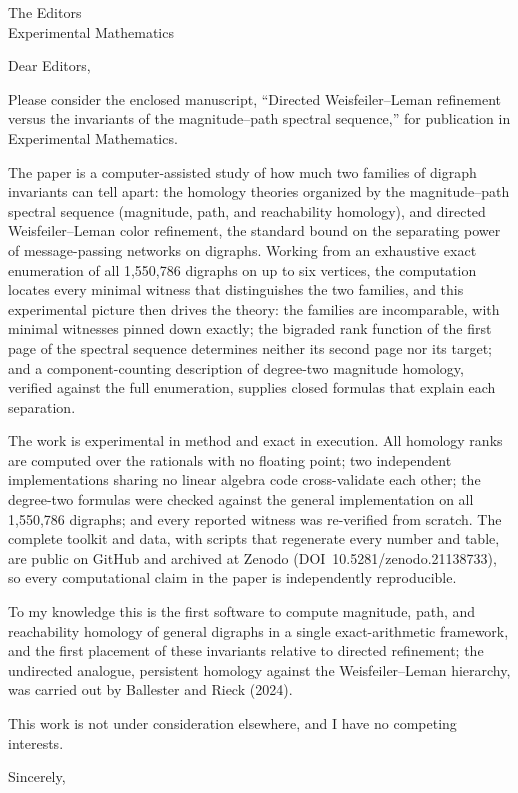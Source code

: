 \documentclass[11pt]{letter}
\begin{document}
\begin{letter}{The Editors\\Experimental Mathematics}

\opening{Dear Editors,}

Please consider the enclosed manuscript, ``Directed Weisfeiler--Leman
refinement versus the invariants of the magnitude--path spectral
sequence,'' for publication in Experimental Mathematics.

The paper is a computer-assisted study of how much two families of
digraph invariants can tell apart: the homology theories organized by
the magnitude--path spectral sequence (magnitude, path, and
reachability homology), and directed Weisfeiler--Leman color
refinement, the standard bound on the separating power of
message-passing networks on digraphs. Working from an exhaustive exact
enumeration of all 1{,}550{,}786 digraphs on up to six vertices, the
computation locates every minimal witness that distinguishes the two
families, and this experimental picture then drives the theory: the
families are incomparable, with minimal witnesses pinned down exactly;
the bigraded rank function of the first page of the spectral sequence
determines neither its second page nor its target; and a
component-counting description of degree-two magnitude homology,
verified against the full enumeration, supplies closed formulas that
explain each separation.

The work is experimental in method and exact in execution. All homology
ranks are computed over the rationals with no floating point; two
independent implementations sharing no linear algebra code
cross-validate each other; the degree-two formulas were checked against
the general implementation on all 1{,}550{,}786 digraphs; and every
reported witness was re-verified from scratch. The complete toolkit and
data, with scripts that regenerate every number and table, are public
on GitHub and archived at Zenodo (DOI~10.5281/zenodo.21138733), so every
computational claim in the paper is independently reproducible.

To my knowledge this is the first software to compute magnitude, path,
and reachability homology of general digraphs in a single
exact-arithmetic framework, and the first placement of these invariants
relative to directed refinement; the undirected analogue, persistent
homology against the Weisfeiler--Leman hierarchy, was carried out by
Ballester and Rieck (2024).

This work is not under consideration elsewhere, and I have no competing
interests.

\closing{Sincerely,}
\end{letter}
\end{document}
